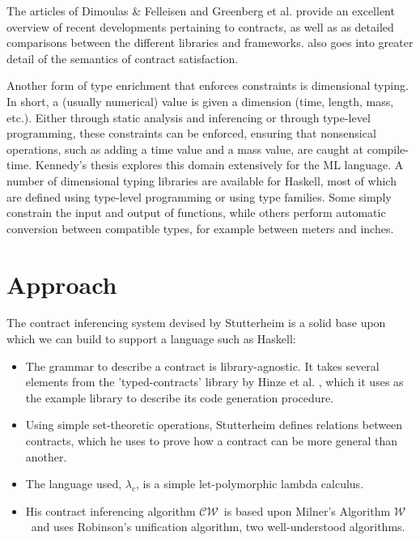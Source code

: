 \documentclass[10pt]{report}
\newcommand{\W}{$\mathcal{W}$}
\newcommand{\CW}{$\mathcal{CW}$}
\begin{document}
The articles of Dimoulas \& Felleisen \cite{Dimoulas:2011:CSH:2039346.2039348} and Greenberg et al. \cite{Greenberg:2010:CMM:1707801.1706341} provide an excellent overview of recent developments pertaining to contracts, as well as as detailed comparisons between the different libraries and frameworks. \cite{Dimoulas:2011:CSH:2039346.2039348} also goes into greater detail of the semantics of contract satisfaction.

Another form of type enrichment that enforces constraints is dimensional typing.
In short, a (usually numerical) value is given a dimension (time, length, mass, etc.).
Either through static analysis and inferencing or through type-level programming, these constraints can be enforced, ensuring that nonsensical operations, such as adding a time value and a mass value, are caught at compile-time.
Kennedy's thesis \cite{langanddim} explores this domain extensively for the ML language. 
A number of dimensional typing libraries are available for Haskell, most of which are defined using type-level programming or using type families.
Some simply constrain the input and output of functions, while others perform automatic conversion between compatible types, for example between meters and inches.

\chapter{Approach}

The contract inferencing system devised by Stutterheim is a solid base upon which we can build to support a language such as Haskell:

\begin{itemize}
	\item The grammar to describe a contract is library-agnostic. It takes several elements from the 'typed-contracts' library by Hinze et al. \cite{Hinze06typedcontracts}, which it uses as the example library to describe its code generation procedure.
	\item Using simple set-theoretic operations, Stutterheim defines relations between contracts, which he uses to prove how a contract can be more general than another.
	\item The language used, $\lambda_c$, is a simple let-polymorphic lambda calculus.
	\item His contract inferencing algorithm \CW ~is based upon Milner's Algorithm \W ~and uses Robinson's unification algorithm, two well-understood algorithms.
\end{itemize}
\end{document}
